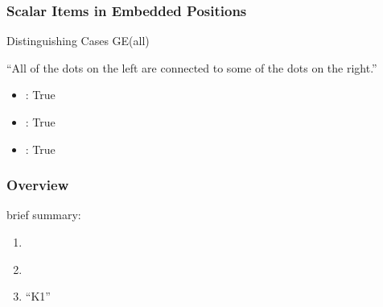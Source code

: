 \documentclass[fleqn,10pt,serif,xcolor=dvipsnames]{beamer}
\newcommand{\lit}{\acro{lit}}
\newcommand{\glb}{\acro{glb}}
\newcommand{\loc}{\acro{loc}}
\newcommand{\GE}{GE}
\begin{document}
\begin{frame}
  \frametitle{Scalar Items in Embedded Positions}
  \begin{block}{Distinguishing Cases \GE \hfill (all)}
    
    \medskip 

    \begin{minipage}[c]{0.5\linewidth}
      \vspace{0pt}
      \end{minipage}
      \begin{minipage}[c]{0.45\linewidth}
        \vspace{0pt}
    ``All of the dots on the left are connected to some of the dots on
    the right.''
    \medskip

        \begin{itemize}
        \item[] \lit: True
        \item[] \glb: True
        \item[] \loc: True 
        \end{itemize}
      \end{minipage}

  \end{block}
\end{frame}

\begin{frame}
  \frametitle{Overview}
  brief summary:
  \begin{enumerate}
  \item \citet{GeurtsPouscoulous2009:Embedded-Implic}
  \item \citet{ChemlaSpector2010:Experimental-Ev}
  \item ``K1''
  \end{enumerate}
\end{frame}
\end{document}

